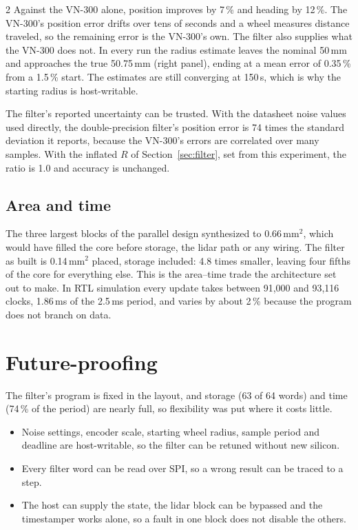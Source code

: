 \documentclass[10pt,letterpaper]{article}
\begin{document}
\begin{multicols}{2}
  Against the VN-300 alone, position improves by 7\,\% and heading by 12\,\%.
  The VN-300's position error drifts over tens of seconds and a wheel measures distance traveled, so the remaining error is the VN-300's own.
  The filter also supplies what the VN-300 does not.
  In every run the radius estimate leaves the nominal 50\,mm and approaches the true 50.75\,mm (right panel), ending at a mean error of 0.35\,\% from a 1.5\,\% start.
  The estimates are still converging at 150\,s, which is why the starting radius is host-writable.

  The filter's reported uncertainty can be trusted.
  With the datasheet noise values used directly, the double-precision filter's position error is 74 times the standard deviation it reports, because the VN-300's errors are correlated over many samples.
  With the inflated $R$ of Section~\ref{sec:filter}, set from this experiment, the ratio is 1.0 and accuracy is unchanged.

  \subsection{Area and time}
  \label{sec:cost}

  The three largest blocks of the parallel design synthesized to 0.66\,mm$^2$, which would have filled the core before storage, the lidar path or any wiring.
  The filter as built is 0.14\,mm$^2$ placed, storage included: 4.8 times smaller, leaving four fifths of the core for everything else.
  This is the area--time trade the architecture set out to make.
  In RTL simulation every update takes between 91,000 and 93,116 clocks, 1.86\,ms of the 2.5\,ms period, and varies by about 2\,\% because the program does not branch on data.

  \section{Future-proofing}

  The filter's program is fixed in the layout, and storage (63 of 64 words) and time (74\,\% of the period) are nearly full, so flexibility was put where it costs little.
  \begin{itemize}
    \item Noise settings, encoder scale, starting wheel radius, sample period and deadline are host-writable, so the filter can be retuned without new silicon.
    \item Every filter word can be read over SPI, so a wrong result can be traced to a step.
    \item The host can supply the state, the lidar block can be bypassed and the timestamper works alone, so a fault in one block does not disable the others.
  \end{itemize}


\end{multicols}
\end{document}
